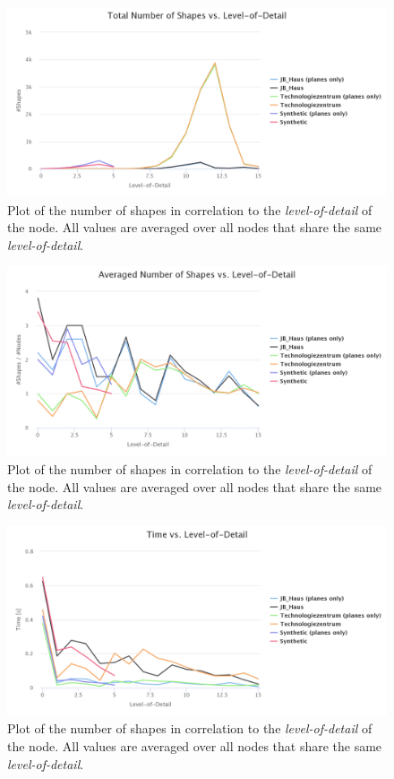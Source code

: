 \begin{figure}[h]
    \centering
    \includegraphics[width=1\textwidth]{Results/shapes_total_vs_lod.png}
    \caption{Plot of the number of shapes in correlation to the \textit{level-of-detail} of the node. All values are averaged over all nodes that share the same \textit{level-of-detail}.}
    \label{fig:shapes_total_vs_lod}
\end{figure}

\begin{figure}[h]
    \centering
    \includegraphics[width=1\textwidth]{Results/shapes_averaged_vs_lod.png}
    \caption{Plot of the number of shapes in correlation to the \textit{level-of-detail} of the node. All values are averaged over all nodes that share the same \textit{level-of-detail}.}
    \label{fig:shapes_averaged_vs_lod}
\end{figure}

\begin{figure}[h]
    \centering
    \includegraphics[width=1\textwidth]{Results/time_vs_lod.png}
    \caption{Plot of the number of shapes in correlation to the \textit{level-of-detail} of the node. All values are averaged over all nodes that share the same \textit{level-of-detail}.}
    \label{fig:time_vs_lod}
\end{figure}


